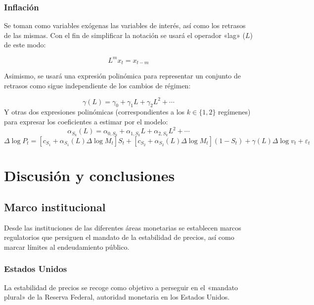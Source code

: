 \documentclass[titlepage, 12pt]{article}
\begin{document}
\subsubsection{Inflación}
Se toman como variables exógenas las variables de interés, así como los retrasos de las mismas. Con el fin de simplificar la notación se usará el operador «lag» ($L$) de este modo:

\begin{equation}
    L^mx_t=x_{t-m}
\end{equation}

Asimismo, se usará una expresión polinómica para representar un conjunto de retrasos como sigue independiente de los cambios de régimen:

\begin{equation}
    \gamma\left(L\right)=\gamma_0+\gamma_1L+\gamma_2L^2+\cdots
\end{equation}
%
Y otras dos expresiones polinómicas (correspondientes a los $k\in\{1,2\}$ regímenes) para expresar los coeficientes a estimar por el modelo:
%
\begin{equation}
    \alpha_{S_k}\left(L\right)=\alpha_{0,S_k}+\alpha_{1,S_k}L+\alpha_{2,S_k}L^2+\cdots
\end{equation}
\begin{equation}
    \Delta\log{P_t}=\left[c_{S_1}+\alpha_{S_1}\left(L\right)\Delta\log{M_t}\right]S_t+\left[c_{S_2}+\alpha_{S_2}\left(L\right)\Delta\log{M_t}\right]\left(1-S_t\right)+\gamma\left(L\right)\Delta\log{v_t}+\varepsilon_t
    \label{eq:markov-cpi}
\end{equation}


\section{Discusión y conclusiones}

\subsection{Marco institucional}
Desde las instituciones de las diferentes áreas monetarias se establecen marcos regulatorios que persiguen el mandato de la estabilidad de precios, así como marcar límites al endeudamiento público.

\subsubsection{Estados Unidos}
La estabilidad de precios se recoge como objetivo a perseguir en el «mandato plural» de la Reserva Federal, autoridad monetaria en los Estados Unidos.
\end{document}
